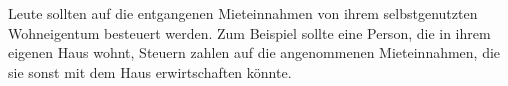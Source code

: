 Leute sollten auf die entgangenen Mieteinnahmen von ihrem selbstgenutzten Wohneigentum besteuert werden.
Zum Beispiel sollte eine Person, die in ihrem eigenen Haus wohnt, Steuern zahlen auf die angenommenen Mieteinnahmen, die sie sonst mit dem Haus erwirtschaften könnte.